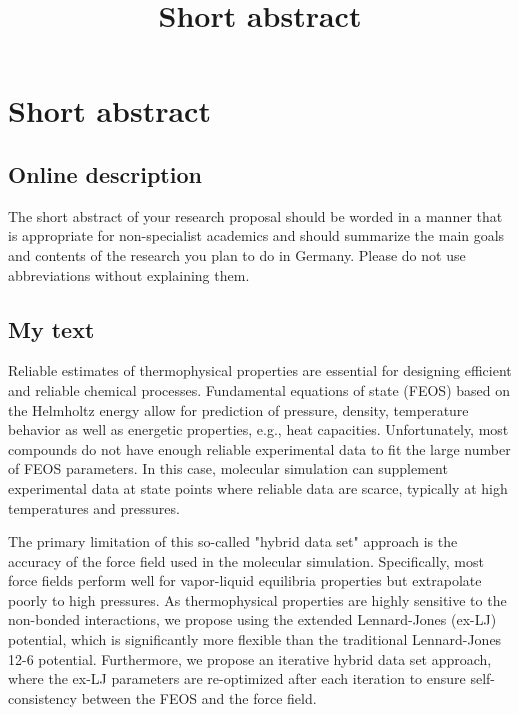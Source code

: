 \documentclass[12pt]{article}
\title{Short abstract}
\date{}
\begin{document}
	
	\maketitle
	
	
	\section*{Short abstract}
	
	\subsection*{Online description}
	
	The short abstract of your research proposal should be worded in a manner that is appropriate for non-specialist academics and should summarize the main goals and contents of the research you plan to do in Germany. Please do not use abbreviations without explaining them.
	
	\subsection*{My text}
	
	Reliable estimates of thermophysical properties are essential for designing efficient and reliable chemical processes. Fundamental equations of state (FEOS) based on the Helmholtz energy allow for prediction of pressure, density, temperature behavior as well as energetic properties, e.g., heat capacities. Unfortunately, most compounds do not have enough reliable experimental data to fit the large number of FEOS parameters. In this case, molecular simulation can supplement experimental data at state points where reliable data are scarce, typically at high temperatures and pressures. 
	
	The primary limitation of this so-called "hybrid data set" approach is the accuracy of the force field used in the molecular simulation. Specifically, most force fields perform well for vapor-liquid equilibria properties but extrapolate poorly to high pressures. As thermophysical properties are highly sensitive to the non-bonded interactions, we propose using the extended Lennard-Jones (ex-LJ) potential, which is significantly more flexible than the traditional Lennard-Jones 12-6 potential. Furthermore, we propose an iterative hybrid data set approach, where the ex-LJ parameters are re-optimized after each iteration to ensure self-consistency between the FEOS and the force field.
	
\end{document}
